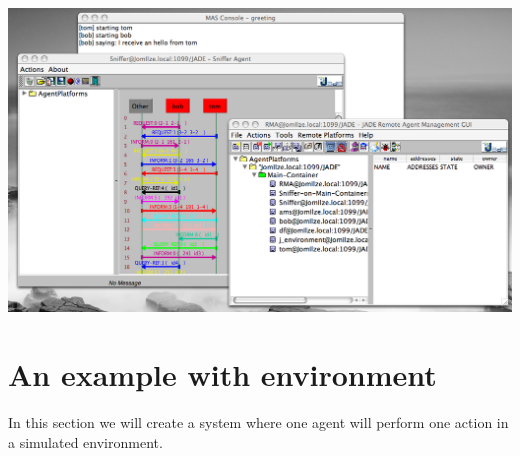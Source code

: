 \documentclass[a4paper]{article}
\begin{document}
\begin{enumerate}
  \includegraphics{figures/screen-runjade.png}

\end{enumerate}



\section{An example with environment}

In this section we will create a system where one agent will perform
one action in a simulated environment.
\end{document}
